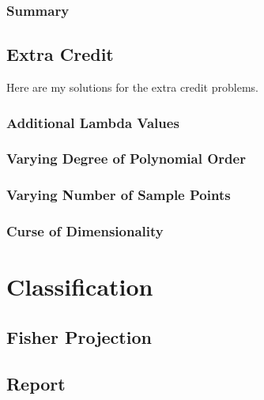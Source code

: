 \documentclass[12pt,twoside,a4paper]{article}
\begin{document}
\subsubsection{Summary}

\subsection{Extra Credit}
Here are my solutions for the extra credit problems.
\subsubsection{Additional Lambda Values}

\subsubsection{Varying Degree of Polynomial Order}

\subsubsection{Varying Number of Sample Points}

\subsubsection{Curse of Dimensionality}

\pagebreak
\section{Classification}

\subsection{Fisher Projection}

\subsection{Report}
\end{document}
